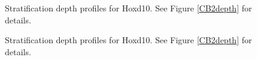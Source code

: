 \documentclass{article}
\begin{document}
\clearpage

\begin{figure}
  \centering
  \caption{Stratification depth profiles for Hoxd10. See Figure
    \ref{CB2depth} for details.}
\end{figure}

\clearpage

\begin{figure}
  \centering
  \caption{Stratification depth profiles for Hoxd10. See Figure
    \ref{CB2depth} for details.}
\end{figure}
\end{document}

